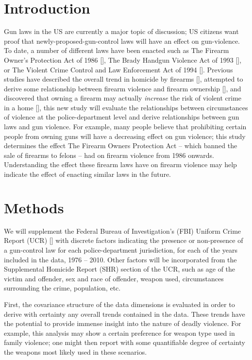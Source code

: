 \begin{multicols}{2}

\section{Introduction}

Gun laws in the US are currently a major topic of discussion; US citizens want proof that newly-proposed-gun-control laws will have an effect on gun-violence.  To date, a number of different laws have been enacted such as The Firearm Owner's Protection Act of 1986 [\cite{fopa}], The Brady Handgun Violence Act of 1993 [\cite{fflra}], or The Violent Crime Control and Law Enforcement Act of 1994 [\cite{vcclea}].  Previous studies have described the overall trend in homicide by firearms [\cite{cooper}], attempted to derive some relationship between firearm violence and firearm ownership [\cite{swedler}], and discovered that owning a firearm may actually \emph{increase} the risk of violent crime in a home [\cite{kellermann}], this new study will evaluate the relationships between circumstances of violence at the police-department level and derive relationships between gun laws and gun violence.  For example, many people believe that prohibiting certain people from owning guns will have a decreasing effect on gun violence; this study determines the effect The Firearm Owners Protection Act -- which banned the sale of firearms to felons -- had on firearm violence from 1986 onwards.  Understanding the effect these firearm laws have on firearm violence may help indicate the effect of enacting similar laws in the future.

\section{Methods}

We will supplement the Federal Bureau of Investigation's (FBI) Uniform Crime Report (UCR) [\cite{shr}] with discrete factors indicating the presence or non-presence of a gun-control law for each police-department jurisdiction, for each of the years included in the data, 1976 -- 2010.  Other factors will be incorporated from the Supplemental Homicide Report (SHR) section of the UCR, such as age of the victim and offender, sex and race of offender, weapon used, circumstances surrounding the crime, population, etc.

First, the covariance structure of the data dimensions is evaluated in order to derive with certainty any overall trends contained in the data.  These trends have the potential to provide immense insight into the nature of deadly violence.  For example, this analysis may show a certain preference for weapon type used in family violence;  one might then report with some quantifiable degree of certainty the weapons most likely used in these scenarios.


\end{multicols}
